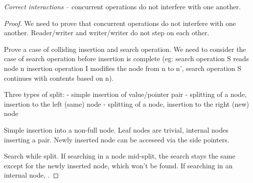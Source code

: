 \begin{theorem}
  \textit{Correct interactions} -- concurrent operations do not interfere with one another.
\end{theorem}


\begin{proof}
  We need to prove that concurrent operations do not interfere with one another. Reader/writer and writer/writer do not step on each other.

  Prove a case of colliding insertion and search operation. We need to consider the case of search operation before insertion is complete (eg: search operation S reads node n insertion operation I modifies the node from n to n', search operation S continues with contents based on n).

  Three types of split:
  - simple insertion of value/pointer pair
  - splitting of a node, insertion to the left (same) node
  - splitting of a node, insertion to the right (new) node

  Simple insertion into a non-full node. Leaf nodes are trivial, internal nodes inserting a pair. Newly inserted node can be acceseed via the side pointers.

  Search while split. If searching in a node mid-split, the search stays the same except for the newly inserted node, which won't be found. If searching in an internal node, .

\end{proof}

